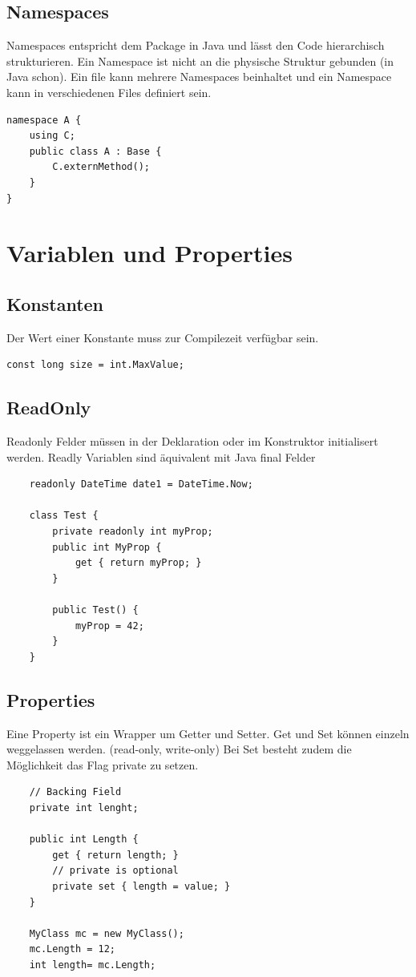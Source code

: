 \documentclass[
a4paper,
oneside,
10pt,
fleqn,
headsepline,
toc=listofnumbered, 
bibliography=totocnumbered]{scrartcl}
\let\stdsection\section
\renewcommand\section{\clearpage\stdsection}
\begin{document}
\subsection{Namespaces}
Namespaces entspricht dem Package in Java und lässt den Code hierarchisch strukturieren. Ein Namespace ist nicht an die physische Struktur gebunden (in Java schon). Ein file kann mehrere Namespaces beinhaltet und ein Namespace kann in verschiedenen Files definiert sein. 
\begin{lstlisting}
namespace A {
	using C;
	public class A : Base {
		C.externMethod();
	}
}
\end{lstlisting}

\section{Variablen und Properties}
\subsection{Konstanten}
Der Wert einer Konstante muss zur Compilezeit verfügbar sein.
\begin{lstlisting}
const long size = int.MaxValue;
\end{lstlisting}

\subsection{ReadOnly}
Readonly Felder müssen in der Deklaration oder im Konstruktor initialisert werden. Readly Variablen sind äquivalent mit Java final Felder
\begin{lstlisting}
	readonly DateTime date1 = DateTime.Now;
	
	class Test {
		private readonly int myProp;
		public int MyProp {
			get { return myProp; }
		}
		
		public Test() {
			myProp = 42;
		}
	}
\end{lstlisting}

\subsection{Properties}
Eine Property ist ein Wrapper um Getter und Setter. Get und Set können einzeln weggelassen werden. (read-only, write-only) Bei Set besteht zudem die Möglichkeit das Flag private zu setzen. 
\begin{lstlisting}
	// Backing Field
	private int lenght;
	
	public int Length {
		get { return length; }
		// private is optional
		private set { length = value; } 
	}
	
	MyClass mc = new MyClass();
	mc.Length = 12;
	int length= mc.Length;
	
\end{lstlisting}
\end{document}
